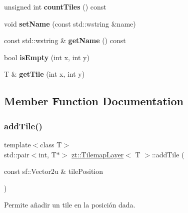 \begin{DoxyCompactItemize}
\mbox{\label{classzt_1_1_tilemap_layer_aaa84d473ece41766d7eab924821b3ed8}} 
unsigned int {\bfseries count\+Tiles} () const
\item 
\mbox{\label{classzt_1_1_tilemap_layer_af8beb5aa8873b00235677aa86d01271e}} 
void {\bfseries set\+Name} (const std\+::wstring \&name)
\item 
\mbox{\label{classzt_1_1_tilemap_layer_a1d892a157ae743bbcd65632dbc10b973}} 
const std\+::wstring \& {\bfseries get\+Name} () const
\item 
\mbox{\label{classzt_1_1_tilemap_layer_a90f1e2ffac9764bf50813a252d4ef859}} 
bool {\bfseries is\+Empty} (int x, int y)
\item 
\mbox{\label{classzt_1_1_tilemap_layer_a7d780310f2514eceb3bfdec5c50913fc}} 
T \& {\bfseries get\+Tile} (int x, int y)
\end{DoxyCompactItemize}


\subsection{Member Function Documentation}
\mbox{\label{classzt_1_1_tilemap_layer_a6fe52aa49bd4965ac7df8a6db0187f5a}} 
\subsubsection{\texorpdfstring{add\+Tile()}{addTile()}}
{\footnotesize\ttfamily template$<$class T$>$ \\
std\+::pair$<$int, T$\ast$$>$ \hyperlink{classzt_1_1_tilemap_layer}{zt\+::\+Tilemap\+Layer}$<$ T $>$\+::add\+Tile (\begin{DoxyParamCaption}\item[{const sf\+::\+Vector2u \&}]{tile\+Position }\end{DoxyParamCaption})\hspace{0.3cm}{\ttfamily [inline]}}



Permite añadir un tile en la posición dada. 


